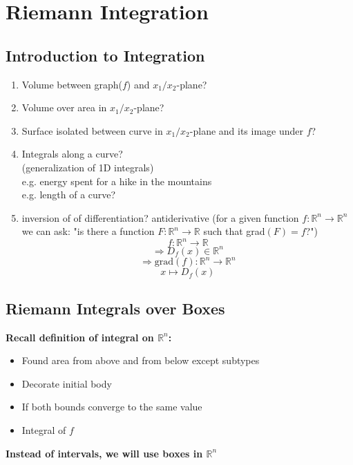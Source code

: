 \documentclass{article}
\begin{document}
\section{Riemann Integration}
\subsection{Introduction to Integration}
\begin{enumerate}
    \item Volume between graph($f$) and $x_1/x_2$-plane?
\item Volume over area in $x_1/x_2$-plane?
\item Surface isolated between curve in $x_1/x_2$-plane and its image under $f$?
\item Integrals along a curve? \\
    (generalization of 1D integrals) \\
    e.g. energy spent for a hike in the mountains \\
    e.g. length of a curve?
    \item inversion of of differentiation? antiderivative (for a given function $f : \mathbb{R}^{n} \rightarrow \mathbb{R}^{n}$ we can ask: "is there a function $F : \mathbb{R}^{n} \rightarrow \mathbb{R}$ such that grad$(F) = f$?") 
    \[ f: \mathbb{R}^n \rightarrow \mathbb{R} \]
    \[ \Rightarrow D_f(x) \in \mathbb{R}^n \]
    \[ \Rightarrow \text{grad}(f): \mathbb{R}^n \rightarrow \mathbb{R}^n \]
    \[ x \mapsto D_f(x) \]
\end{enumerate}
\subsection{Riemann Integrals over Boxes}

\textbf{Recall definition of integral on $\mathbb{R}^n$:}
\begin{itemize}
\item Found area from above and from below except subtypes
\item Decorate initial body
\item If both bounds converge to the same value
\item Integral of $f$
\end{itemize}

\textbf{Instead of intervals, we will use boxes in $\mathbb{R}^n$}
\end{document}
